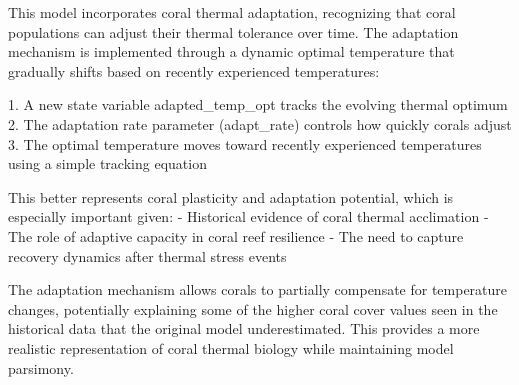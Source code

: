 This model incorporates coral thermal adaptation, recognizing that coral populations can adjust their thermal tolerance over time. The adaptation mechanism is implemented through a dynamic optimal temperature that gradually shifts based on recently experienced temperatures:

1. A new state variable adapted_temp_opt tracks the evolving thermal optimum
2. The adaptation rate parameter (adapt_rate) controls how quickly corals adjust
3. The optimal temperature moves toward recently experienced temperatures using a simple tracking equation

This better represents coral plasticity and adaptation potential, which is especially important given:
- Historical evidence of coral thermal acclimation
- The role of adaptive capacity in coral reef resilience
- The need to capture recovery dynamics after thermal stress events

The adaptation mechanism allows corals to partially compensate for temperature changes, potentially explaining some of the higher coral cover values seen in the historical data that the original model underestimated. This provides a more realistic representation of coral thermal biology while maintaining model parsimony.

